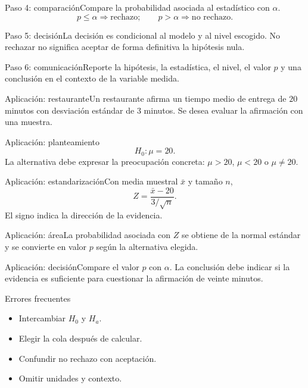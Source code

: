 \documentclass[10pt,aspectratio=169]{beamer}
\begin{document}
\begin{frame}{Paso 4: comparación}\small Compare la probabilidad asociada al estadístico con $\alpha$.\[p\leq\alpha\Rightarrow\text{rechazo};\qquad p>\alpha\Rightarrow\text{no rechazo}.\]\end{frame}
\begin{frame}{Paso 5: decisión}\small La decisión es condicional al modelo y al nivel escogido. No rechazar no significa aceptar de forma definitiva la hipótesis nula.\end{frame}
\begin{frame}{Paso 6: comunicación}\small Reporte la hipótesis, la estadística, el nivel, el valor $p$ y una conclusión en el contexto de la variable medida.\end{frame}
\begin{frame}{Aplicación: restaurante}\small Un restaurante afirma un tiempo medio de entrega de $20$ minutos con desviación estándar de $3$ minutos. Se desea evaluar la afirmación con una muestra.\end{frame}
\begin{frame}{Aplicación: planteamiento}\small\[H_0:\mu=20.\]La alternativa debe expresar la preocupación concreta: $\mu>20$, $\mu<20$ o $\mu\neq20$.\end{frame}
\begin{frame}{Aplicación: estandarización}\small Con media muestral $\bar x$ y tamaño $n$,\[Z=\frac{\bar x-20}{3/\sqrt n}.\]El signo indica la dirección de la evidencia.\end{frame}
\begin{frame}{Aplicación: área}\small La probabilidad asociada con $Z$ se obtiene de la normal estándar y se convierte en valor $p$ según la alternativa elegida.\end{frame}
\begin{frame}{Aplicación: decisión}\small Compare el valor $p$ con $\alpha$. La conclusión debe indicar si la evidencia es suficiente para cuestionar la afirmación de veinte minutos.\end{frame}
\begin{frame}{Errores frecuentes}\small\begin{itemize}\item Intercambiar $H_0$ y $H_a$.\item Elegir la cola después de calcular.\item Confundir no rechazo con aceptación.\item Omitir unidades y contexto.\end{itemize}\end{frame}
\end{document}
